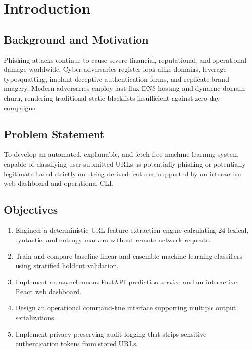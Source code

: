 \documentclass[12pt,a4paper]{report}
\begin{document}
\tableofcontents
\listoffigures
\listoftables

\chapter{Introduction}
\section{Background and Motivation}
Phishing attacks continue to cause severe financial, reputational, and operational damage worldwide. Cyber adversaries register look-alike domains, leverage typosquatting, implant deceptive authentication forms, and replicate brand imagery. Modern adversaries employ fast-flux DNS hosting and dynamic domain churn, rendering traditional static blacklists insufficient against zero-day campaigns.

\section{Problem Statement}
To develop an automated, explainable, and fetch-free machine learning system capable of classifying user-submitted URLs as potentially phishing or potentially legitimate based strictly on string-derived features, supported by an interactive web dashboard and operational CLI.

\section{Objectives}
\begin{enumerate}
    \item Engineer a deterministic URL feature extraction engine calculating 24 lexical, syntactic, and entropy markers without remote network requests.
    \item Train and compare baseline linear and ensemble machine learning classifiers using stratified holdout validation.
    \item Implement an asynchronous FastAPI prediction service and an interactive React web dashboard.
    \item Design an operational command-line interface supporting multiple output serializations.
    \item Implement privacy-preserving audit logging that strips sensitive authentication tokens from stored URLs.
\end{enumerate}
\end{document}
